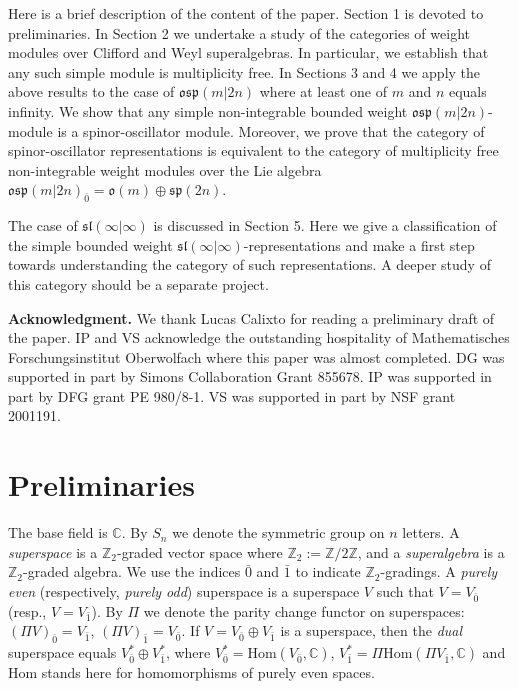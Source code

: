 \documentclass[12pt]{amsart}
\theoremstyle{plain} %
\numberwithin{equation}{section}
\theoremstyle{definition}
\theoremstyle{remark}
\theoremstyle{plain} %
\renewcommand{\sp}{\mathfrak{sp}}
\renewcommand{\sl}{\mathfrak{sl}}
\newcommand{\osp}{\mathfrak{osp}}
\newcommand{\Hom}{\mathrm{Hom}}
\newcommand{\C}{\mathbb{C}}
\def\go{\mathfrak{o}}
\begin{document}
Here is a brief description of the content of the paper. Section 1 is devoted to preliminaries. In Section 2 we undertake a study of the categories of weight modules over Clifford and Weyl  superalgebras. In particular, we establish that any such simple  module is multiplicity free.  In Sections 3 and 4 we apply the above results to the case of $\osp (m|2n)$  where at least one of $m$ and $n$ equals infinity. We show that any simple non-integrable bounded weight  $\osp (m|2n)$-module is a spinor-oscillator module. Moreover, we prove that the category of spinor-oscillator representations is equivalent to the category of multiplicity free non-integrable weight modules over the Lie algebra  $\osp (m|2n)_{\bar{0}} = \go (m) \oplus \sp (2n)$.


The case of $\sl (\infty |\infty)$ is discussed in Section 5.  Here we give a classification of the simple bounded weight $\sl (\infty |\infty)$-representations and make a first step towards  understanding  the category of such representations. A deeper study of this category should be a separate project. 


\medskip
{\bf Acknowledgment.} We thank Lucas Calixto for reading a preliminary draft of the paper. IP and VS acknowledge the outstanding hospitality of Mathematisches Forschungsinstitut Oberwolfach where this paper was almost completed.
DG was supported in part by Simons Collaboration Grant 855678. IP was supported in part by DFG grant PE 980/8-1.  VS was supported in part by
NSF grant 2001191. 
   \section{Preliminaries}\label{prelim}
   
   The base field is $\C$. By $S_n$ we denote the symmetric group on $n$ letters. A \emph{superspace} is a $\mathbb Z_2$-graded vector space where $\mathbb Z_2 := \mathbb Z/2\mathbb Z$, and a \emph{superalgebra} is a $\mathbb Z_2$-graded algebra. We use the indices $\bar{0}$ and $\bar{1}$ 
  to indicate $\mathbb Z_2$-gradings.  
  A \emph{purely even}  (respectively, \emph{purely odd}) superspace is a superspace $V$ such that   $V = V_{\bar{0}}$ (resp., $V = V_{\bar{1}}$). By $\Pi$ we denote the parity change functor on  superspaces:  $(\Pi V)_{\bar{0}} = V_{\bar{1}} $, $(\Pi V)_{\bar{1}} = V_{\bar{0}}$. If $V = V_{\bar{0}} \oplus  V_{\bar{1}}$ is a superspace, then the \emph{dual} superspace equals $V_{\bar{0}}^* \oplus  V_{\bar{1}}^*$, where  $V_{\bar{0}}^* = \Hom (V_{\bar{0}}, \mathbb C)$, $V_{\bar{1}}^* = \Pi \Hom (\Pi V_{\bar{1}}, \mathbb C)$ and $\Hom$ stands here for homomorphisms of purely even spaces.
\end{document}
